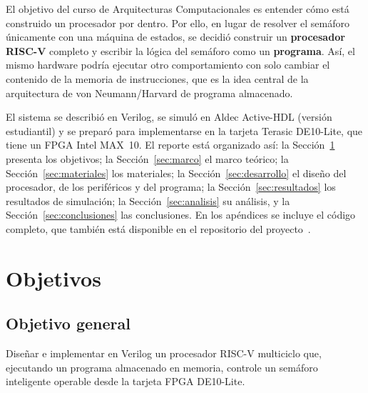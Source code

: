 \documentclass[12pt,letterpaper]{article}
\begin{document}
El objetivo del curso de Arquitecturas Computacionales es entender cómo está construido un
procesador por dentro. Por ello, en lugar de resolver el semáforo únicamente con una máquina de
estados, se decidió construir un \textbf{procesador RISC-V} completo y escribir la lógica del
semáforo como un \textbf{programa}. Así, el mismo hardware podría ejecutar otro comportamiento
con solo cambiar el contenido de la memoria de instrucciones, que es la idea central de la
arquitectura de von Neumann/Harvard de programa almacenado.

El sistema se describió en Verilog, se simuló en Aldec Active-HDL (versión estudiantil) y se
preparó para implementarse en la tarjeta Terasic DE10-Lite, que tiene un FPGA Intel MAX~10.
El reporte está organizado así: la Sección~\ref{sec:objetivos} presenta los objetivos; la
Sección~\ref{sec:marco} el marco teórico; la Sección~\ref{sec:materiales} los materiales; la
Sección~\ref{sec:desarrollo} el diseño del procesador, de los periféricos y del programa; la
Sección~\ref{sec:resultados} los resultados de simulación; la Sección~\ref{sec:analisis} su
análisis, y la Sección~\ref{sec:conclusiones} las conclusiones. En los apéndices se incluye el
código completo, que también está disponible en el repositorio del proyecto~\cite{repo}.

\section{Objetivos}\label{sec:objetivos}
\subsection{Objetivo general}
Diseñar e implementar en Verilog un procesador RISC-V multiciclo que, ejecutando un programa
almacenado en memoria, controle un semáforo inteligente operable desde la tarjeta FPGA DE10-Lite.
\end{document}
